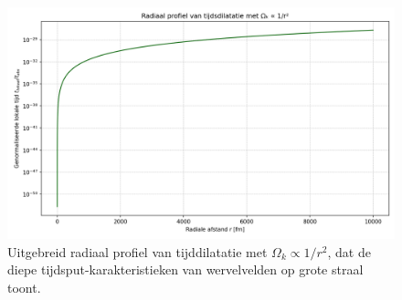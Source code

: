 \begin{figure}[ht!]
    \centering
    \includegraphics[width=0.7\linewidth]{05-LogarithmicDecayLocalTime_nl}
    \caption{Uitgebreid radiaal profiel van tijddilatatie met $\Omega_k \propto 1/r^2$, dat de diepe tijdsput-karakteristieken van wervelvelden op grote straal toont.}
    \label{fig:NewGraph}
\end{figure}